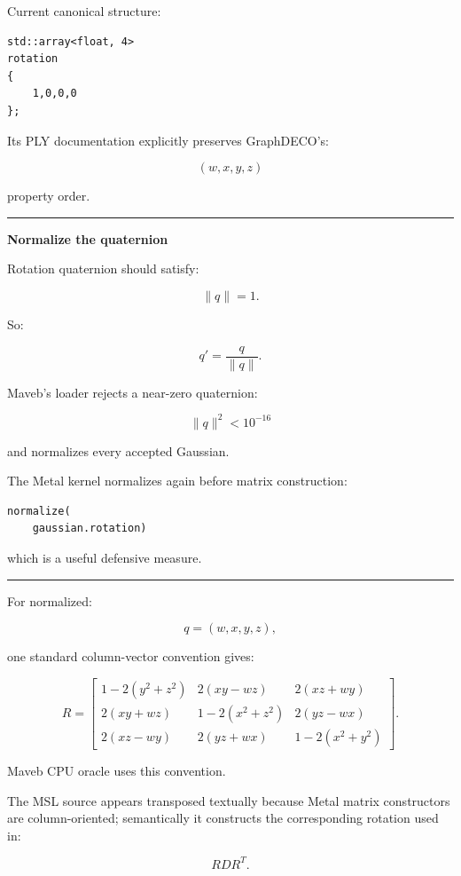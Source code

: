 Current canonical structure:

\begin{verbatim}
std::array<float, 4>
rotation
{
    1,0,0,0
};
\end{verbatim}

Its PLY documentation explicitly preserves GraphDECO's:

\[
(w,x,y,z)
\]

property order.

\begin{center}\rule{0.5\linewidth}{0.5pt}\end{center}

\textbf{Normalize the quaternion}

Rotation quaternion should satisfy:

\[
\|q\|=1.
\]

So:

\[
q'
=
\frac{q}{\|q\|}.
\]

Maveb's loader rejects a near-zero quaternion:

\[
\|q\|^2<10^{-16}
\]

and normalizes every accepted Gaussian.

The Metal kernel normalizes again before matrix construction:

\begin{verbatim}
normalize(
    gaussian.rotation)
\end{verbatim}

which is a useful defensive measure.

\begin{center}\rule{0.5\linewidth}{0.5pt}\end{center}

For normalized:

\[
q=(w,x,y,z),
\]

one standard column-vector convention gives:

\[
R=
\begin{bmatrix}
1-2(y^2+z^2)
&
2(xy-wz)
&
2(xz+wy)
\\
2(xy+wz)
&
1-2(x^2+z^2)
&
2(yz-wx)
\\
2(xz-wy)
&
2(yz+wx)
&
1-2(x^2+y^2)
\end{bmatrix}.
\]

Maveb CPU oracle uses this convention.

The MSL source appears transposed textually because Metal matrix constructors are column-oriented; semantically it constructs the corresponding rotation used in:

\[
RDR^T.
\]

